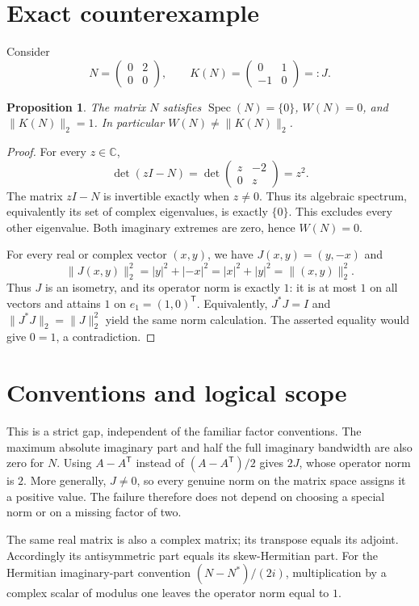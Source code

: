 \documentclass[11pt]{article}
\newtheorem{proposition}{Proposition}
\newcommand{\Spec}{\operatorname{Spec}}
\begin{document}
\section{Exact counterexample}
Consider
\[
 N=\begin{pmatrix}0&2\\0&0\end{pmatrix},
 \qquad
 K(N)=\begin{pmatrix}0&1\\-1&0\end{pmatrix}=:J.
\]
\begin{proposition}
The matrix $N$ satisfies $\Spec(N)=\{0\}$, $W(N)=0$, and
$\|K(N)\|_2=1$. In particular $W(N)\ne\|K(N)\|_2$.
\end{proposition}
\begin{proof}
For every $z\in\mathbb C$,
\[
 \det(zI-N)=\det\begin{pmatrix}z&-2\\0&z\end{pmatrix}=z^2.
\]
The matrix $zI-N$ is invertible exactly when $z\ne0$. Thus its algebraic
spectrum, equivalently its set of complex eigenvalues, is exactly
$\{0\}$. This excludes every other eigenvalue. Both imaginary extremes
are zero, hence $W(N)=0$.

For every real or complex vector $(x,y)$, we have
$J(x,y)=(y,-x)$ and
\[
 \|J(x,y)\|_2^2=|y|^2+|-x|^2
                =|x|^2+|y|^2=\|(x,y)\|_2^2.
\]
Thus $J$ is an isometry, and its operator norm is exactly $1$:
it is at most $1$ on all vectors and attains $1$ on
$e_1=(1,0)^{\mathsf T}$. Equivalently, $J^*J=I$ and
$\|J^*J\|_2=\|J\|_2^2$ yield the same norm calculation.
The asserted equality would give $0=1$, a contradiction.
\end{proof}

\section{Conventions and logical scope}
This is a strict gap, independent of the familiar factor conventions.
The maximum absolute imaginary part and half the full imaginary bandwidth
are also zero for $N$. Using $A-A^{\mathsf T}$ instead of
$(A-A^{\mathsf T})/2$ gives $2J$, whose operator norm is $2$.
More generally, $J\ne0$, so every genuine norm on the matrix space assigns
it a positive value. The failure therefore does not depend on choosing a
special norm or on a missing factor of two.

The same real matrix is also a complex matrix; its transpose equals its
adjoint. Accordingly its antisymmetric part equals its skew-Hermitian
part. For the Hermitian imaginary-part convention $(N-N^*)/(2i)$,
multiplication by a complex scalar of modulus one leaves the operator
norm equal to $1$.
\end{document}
